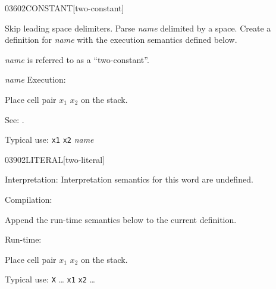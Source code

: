 \begin{newword}{0360}{2CONSTANT}[two-constant]

	Skip leading space delimiters. Parse \emph{name} delimited by
	a space. Create a definition for \emph{name} with the execution
	semantics defined below.

	\emph{name} is referred to as a ``two-constant''.

\item[\emph{name} Execution:]

	Place cell pair $x_1$ $x_2$ on the stack.

\item[See:]
	.

	\begin{rationale} %
		Typical use:
			\texttt{x1} \texttt{x2}  \emph{name}
	\end{rationale}
\end{newword}


\begin{newword*}{0390}{2LITERAL}[two-literal]
\item[Interpretation:]
	Interpretation semantics for this word are undefined.

\item[Compilation:]

	Append the run-time semantics below to the current definition.

\item[Run-time:]

	Place cell pair $x_1$ $x_2$ on the stack.

	\begin{rationale} %
		Typical use:
			\word{:} \texttt{X} {\ldots}
				\word{[} \texttt{x1} \texttt{x2} \word{]} 
			{\ldots} \word{;}
	\end{rationale}
\end{newword*}


